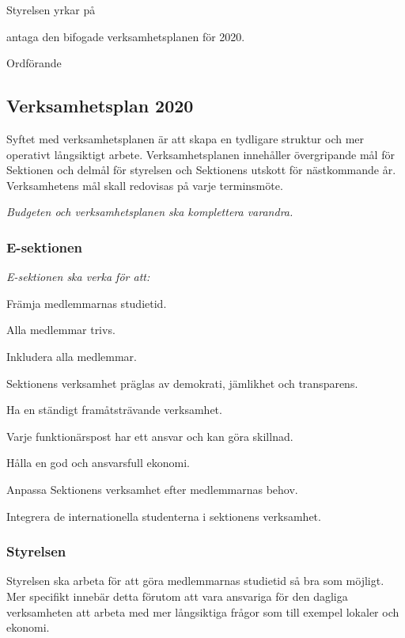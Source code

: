 \documentclass[../_main/handlingar.tex]{subfiles}
\begin{document}

Styrelsen yrkar på

\begin{attsatser}
    \att antaga den bifogade verksamhetsplanen för 2020.
\end{attsatser}

\begin{signatures}{1}
    \ist
    \signature{\ordf}{Ordförande}
\end{signatures}

\subsection*{Verksamhetsplan 2020}
Syftet med verksamhetsplanen är att skapa en tydligare struktur och mer operativt långsiktigt arbete. Verksamhetsplanen innehåller övergripande mål för Sektionen och delmål för styrelsen och Sektionens utskott för nästkommande år. Verksamhetens mål skall redovisas på varje terminsmöte.

\emph{Budgeten och verksamhetsplanen ska komplettera varandra.}

\subsubsection*{E-sektionen}
\emph{E-sektionen ska verka för att:}
\begin{dashlist}
    \item Främja medlemmarnas studietid. 
    \item Alla medlemmar trivs.
    \item Inkludera alla medlemmar. 
    \item Sektionens verksamhet präglas av demokrati, jämlikhet och transparens.
    \item Ha en ständigt framåtsträvande verksamhet. 
    \item Varje funktionärspost har ett ansvar och kan göra skillnad. 
    \item Hålla en god och ansvarsfull ekonomi. 
    \item Anpassa Sektionens verksamhet efter medlemmarnas behov.
    \item Integrera de internationella studenterna i sektionens verksamhet.
\end{dashlist}

\subsubsection*{Styrelsen}
Styrelsen ska arbeta för att göra medlemmarnas studietid så bra som möjligt. Mer specifikt innebär detta förutom att vara ansvariga för den dagliga verksamheten att arbeta med mer långsiktiga frågor som till exempel lokaler och ekonomi.
\end{document}
